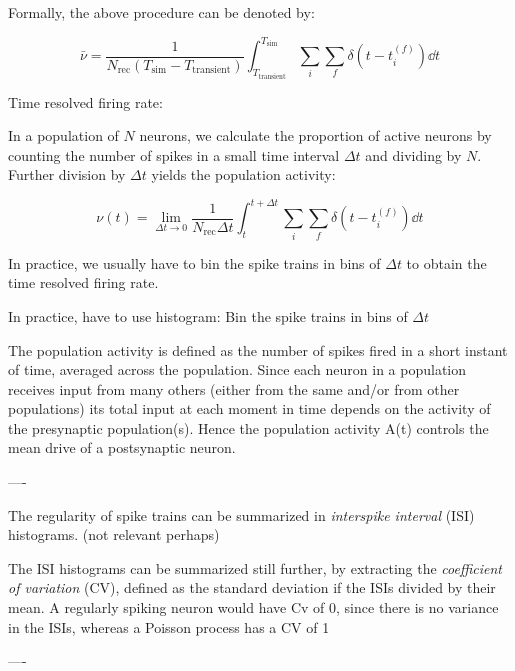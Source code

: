 Formally, the above procedure can be denoted by: 

\begin{equation}
    \bar{\nu} = \frac{1}{N_\mathrm{rec} \left(T_\mathrm{sim} - T_\mathrm{transient}\right)} \int_{T_\mathrm{transient}}^{T_\mathrm{sim}} \sum_i \sum_f \delta \left(t - t_i^{(f)} \right) \dd{t}
\end{equation}

Time resolved firing rate: 

In a population of $N$ neurons, we calculate the proportion of active neurons by counting the number of spikes in a small time interval $\Delta t$ and dividing by $N$. Further division by $\Delta t$ yields the population activity:

\begin{equation}
    \nu (t) = \lim_{\Delta t \to 0} \frac{1}{N_\mathrm{rec} \Delta t} \int_{t}^{t + \Delta t} \sum_i \sum_f \delta \left(t - t_i^{(f)} \right) \dd{t}
\end{equation} 

In practice, we usually have to bin the spike trains in bins of $\Delta t$ to obtain the time resolved firing rate. 

In practice, have to use histogram: Bin the spike trains in bins of $\Delta t$


The population activity is defined as the number of spikes fired in a short instant of time, averaged across the population. Since each neuron in a population receives input from many others (either from the same and/or from other populations) its total input at each moment in time depends on the activity of the presynaptic population(s). Hence the population activity A(t) controls the mean drive of a postsynaptic neuron.





----

The regularity of spike trains can be summarized in \textit{interspike interval} (ISI) histograms. (not relevant perhaps) 

The ISI histograms can be summarized still further, by extracting the \textit{coefficient of variation} (CV), defined as the standard deviation if the ISIs divided by their mean. A regularly spiking neuron would have Cv of 0, since there is no variance in the ISIs, whereas a Poisson process has a CV of 1

----






